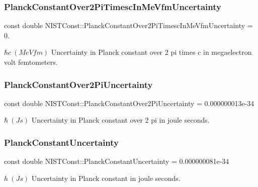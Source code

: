 \subsubsection{\texorpdfstring{Planck\+Constant\+Over2\+Pi\+Timesc\+In\+Me\+Vfm\+Uncertainty}{PlanckConstantOver2PiTimescInMeVfmUncertainty}}
{\footnotesize\ttfamily const double N\+I\+S\+T\+Const\+::\+Planck\+Constant\+Over2\+Pi\+Timesc\+In\+Me\+Vfm\+Uncertainty = 0.}

$\hbar c \ (MeV fm)$ Uncertainty in Planck constant over 2 pi times c in megaelectron volt femtometers. \mbox{\label{group___planck_constant_ga9a87455000578edf387376117fd5bfd8}} 
\subsubsection{\texorpdfstring{Planck\+Constant\+Over2\+Pi\+Uncertainty}{PlanckConstantOver2PiUncertainty}}
{\footnotesize\ttfamily const double N\+I\+S\+T\+Const\+::\+Planck\+Constant\+Over2\+Pi\+Uncertainty = 0.\+000000013e-\/34}

$\hbar \ (J s)$ Uncertainty in Planck constant over 2 pi in joule seconds. \mbox{\label{group___planck_constant_gaf490152b8477c6ead134e42e76753f64}} 
\subsubsection{\texorpdfstring{Planck\+Constant\+Uncertainty}{PlanckConstantUncertainty}}
{\footnotesize\ttfamily const double N\+I\+S\+T\+Const\+::\+Planck\+Constant\+Uncertainty = 0.\+000000081e-\/34}

$h \ (J s)$ Uncertainty in Planck constant in joule seconds. \mbox{\label{group___planck_constant_ga91e80f15330603015f6f8f8e8f49c926}} 
